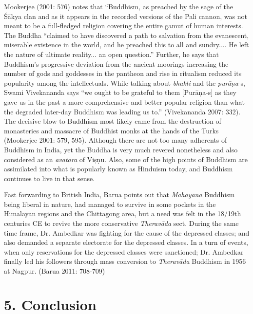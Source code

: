 Mookerjee (2001: 576) notes that “Buddhism, as preached by the sage of the Śākya clan and as it appears in the recorded versions of the Pali cannon, was not meant to be a full-fledged religion covering the entire gamut of human interests. The Buddha “claimed to have discovered a path to salvation from the evanescent, miserable existence in the world, and he preached this to all and sundry.... He left the nature of ultimate reality... an open question.” Further, he says that Buddhism’s progressive deviation from the ancient moorings increasing the number of gods and goddesses in the pantheon and rise in ritualism reduced its popularity among the intellectuals. While talking about \textit{bhakti} and the \textit{purāṇa}-s, Swami Vivekananda says “we ought to be grateful to them [Purāṇa-s] as they gave us in the past a more comprehensive and better popular religion than what the degraded later-day Buddhism was leading us to.” (Vivekananda 2007: 332). The decisive blow to Buddhism most likely came from the destruction of monasteries and massacre of Buddhist monks at the hands of the Turks (Mookerjee 2001: 579, 595). Although there are not too many adherents of Buddhism in India, yet the Buddha is very much revered nonetheless and also considered as an \textit{avatāra} of Viṣṇu. Also, some of the high points of Buddhism are assimilated into what is popularly known as Hinduism today, and Buddhism continues to live in that sense.

Fast forwarding to British India, Barua points out that \textit{Mahāyāna} Buddhism being liberal in nature, had managed to survive in some pockets in the Himalayan regions and the Chittagong area, but a need was felt in the 18/19th centuries CE to revive the more conservative \textit{Theravāda} sect. During the same time frame, Dr. Ambedkar was fighting for the cause of the depressed classes; and also demanded a separate electorate for the depressed classes. In a turn of events, when only reservations for the depressed classes were sanctioned; Dr. Ambedkar finally led his followers through mass conversion to \textit{Theravāda} Buddhism in 1956 at Nagpur. (Barua 2011: 708-709)

\vspace{-.3cm}

\section*{5. Conclusion}


